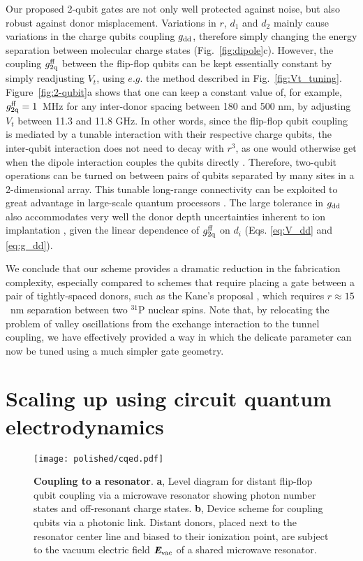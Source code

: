 Our proposed 2-qubit gates are not only well protected against noise, but also robust against donor misplacement. Variations in $r$, $d_1$ and $d_2$ mainly cause variations in the charge qubits coupling $g_{\rm dd}$, therefore simply changing the energy separation between molecular charge states (Fig.~\ref{fig:dipole}c). However, the coupling $g_{\rm 2q}^{\rm ff}$ between the flip-flop qubits can be kept essentially constant by simply readjusting $V_t$, using $e.g.$ the method described in Fig.~\ref{fig:Vt_tuning}. Figure~\ref{fig:2-qubit}a shows that one can keep a constant value of, for example, $g_{\rm 2q}^{\rm ff} = 1$~MHz for any inter-donor spacing between 180 and 500 nm, by adjusting $V_t$ between 11.3 and 11.8 GHz. In other words, since the flip-flop qubit coupling is mediated by a tunable interaction with their respective charge qubits, the inter-qubit interaction does not need to decay with $r^3$, as one would otherwise get when the dipole interaction couples the qubits directly \cite{OGorman2016,Hill2015}. Therefore, two-qubit operations can be turned on between pairs of qubits separated by many sites in a 2-dimensional array. This tunable long-range connectivity can be exploited to great advantage in large-scale quantum processors \cite{Li2018}. The large tolerance in $g_{\rm dd}$ also accommodates very well the donor depth uncertainties inherent to ion implantation \cite{VanDonkelaar2015}, given the linear dependence of $g_{\rm 2q}^{\rm ff}$ on $d_i$ (Eqs. \ref{eq:V_dd} and \ref{eq:g_dd}).  

We conclude that our scheme provides a dramatic reduction in the fabrication complexity, especially compared to schemes that require placing a gate between a pair of tightly-spaced donors, such as the Kane's proposal \cite{Kane1998}, which requires $r\approx15$~nm separation between two $^{31}$P nuclear spins. Note that, by relocating the problem of valley oscillations from the exchange interaction \cite{Kane1998} to the tunnel coupling, we have effectively provided a way in which the delicate parameter can now be tuned using a much simpler gate geometry.


\section{Scaling up using circuit quantum electrodynamics}

\begin{figure}
	\centering
	\texttt{[image: polished/cqed.pdf]}
	\caption[Coupling to a resonator]{\textbf{Coupling to a resonator}.
		\textbf{a}, Level diagram for distant flip-flop qubit coupling via a microwave resonator showing photon number states and off-resonant charge states. 
		\textbf{b}, Device scheme for coupling qubits via a photonic link. Distant donors, placed next to the resonator center line and biased to their ionization point, are subject to the vacuum electric field $\textit{\textbf{E}}_{\rm vac}$ of a shared microwave resonator.}
	\label{fig:cqed}
\end{figure}

